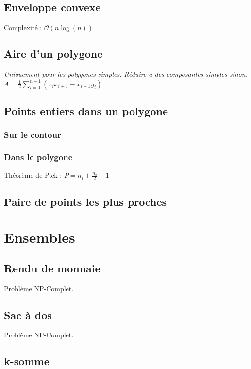 \documentclass[8pt]{article}
\begin{document}
        \subsection{Enveloppe convexe}
            Complexité : $\mathcal{O}(n \log(n))$
            {\scriptsize}
        \subsection{Aire d'un polygone}
        \textit{Uniquement pour les polygones simples. Réduire à des composantes simples sinon.}
        $A = \frac{1}{2} \sum_{i=0}^{n-1}\left(x_{i}x_{i+1} - x_{i+1}y_{i}\right)$
        {\scriptsize}
        \subsection{Points entiers dans un polygone}
            \subsubsection{Sur le contour}
            \subsubsection{Dans le polygone}
                Théorème de Pick :
                $P = n_{i} + \frac{n_{b}}{2}-1$
        \subsection{Paire de points les plus proches}
    \section{Ensembles}
        \subsection{Rendu de monnaie}
        Problème NP-Complet.
        {\scriptsize}
        \subsection{Sac à dos}
        Problème NP-Complet.
        {\scriptsize}
        \subsection{k-somme}
\end{document}
